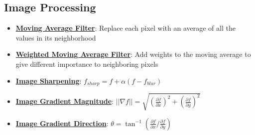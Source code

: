 \documentclass{article}%
\begin{document}
%
\subsection{Image Processing}%
\label{subsec:ImageProcessing}%
\begin{itemize}[leftmargin=*]%
\item \href{https://purdue.brightspace.com/d2l/common/assets/pdfjs-d2l-dist/1.0.14-legacy/web/viewer.html?file=%2Fcontent%2Fenforced%2F1095467-wl.202510.CS.24300.001%2F07L2-Vision.pdf%3Fou%3D1095467&lang=en-us&container=d2l-fileviewer-rendered-pdf&fullscreen=d2l-fileviewer-rendered-pdf-dialog&height=667#page=38}{\textbf{Moving Average Filter}}: Replace each pixel with an average of all the values in its neighborhood%
\item \href{https://purdue.brightspace.com/d2l/common/assets/pdfjs-d2l-dist/1.0.14-legacy/web/viewer.html?file=%2Fcontent%2Fenforced%2F1095467-wl.202510.CS.24300.001%2F07L2-Vision.pdf%3Fou%3D1095467&lang=en-us&container=d2l-fileviewer-rendered-pdf&fullscreen=d2l-fileviewer-rendered-pdf-dialog&height=667#page=40}{\textbf{Weighted Moving Average Filter}}: Add weights to the moving average to give different importance to neighboring pixels%
\item \href{https://purdue.brightspace.com/d2l/common/assets/pdfjs-d2l-dist/1.0.14-legacy/web/viewer.html?file=%2Fcontent%2Fenforced%2F1095467-wl.202510.CS.24300.001%2F07L2-Vision.pdf%3Fou%3D1095467&lang=en-us&container=d2l-fileviewer-rendered-pdf&fullscreen=d2l-fileviewer-rendered-pdf-dialog&height=667#page=55}{\textbf{Image Sharpening}}: $f_{sharp} = f + \alpha(f - f_{blur})$%
\item \href{https://purdue.brightspace.com/d2l/common/assets/pdfjs-d2l-dist/1.0.14-legacy/web/viewer.html?file=%2Fcontent%2Fenforced%2F1095467-wl.202510.CS.24300.001%2F08L2-Feature Extraction.pdf%3Fou%3D1095467&lang=en-us&container=d2l-fileviewer-rendered-pdf&fullscreen=d2l-fileviewer-rendered-pdf-dialog&height=667#page=17}{\textbf{Image Gradient Magnitude}}: $||\nabla f|| = \sqrt{(\frac{\partial f}{\partial x})^2 + (\frac{\partial f}{\partial y})^2}$%
\item \href{https://purdue.brightspace.com/d2l/common/assets/pdfjs-d2l-dist/1.0.14-legacy/web/viewer.html?file=%2Fcontent%2Fenforced%2F1095467-wl.202510.CS.24300.001%2F08L2-Feature Extraction.pdf%3Fou%3D1095467&lang=en-us&container=d2l-fileviewer-rendered-pdf&fullscreen=d2l-fileviewer-rendered-pdf-dialog&height=667#page=34}{\textbf{Image Gradient Direction}}: $\theta = \tan^{-1}(\frac{\partial f}{\partial x} / \frac{\partial f}{\partial y})$%

\end{itemize}
\end{document}
